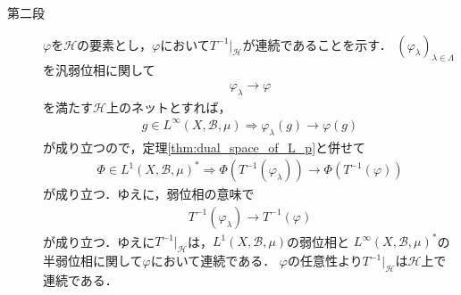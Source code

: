 \begin{description}
		\item[第二段] $\varphi$を$\mathscr{H}$の要素とし，$\varphi$において$T^{-1}|_{\mathscr{H}}$が連続であることを示す．
			$(\varphi_\lambda)_{\lambda \in \Lambda}$を汎弱位相に関して
			\begin{align}
				\varphi_\lambda \longrightarrow \varphi
			\end{align}
			を満たす$\mathscr{H}$上のネットとすれば，
			\begin{align}
				g \in L^\infty(X,\mathcal{B},\mu) \Longrightarrow \varphi_\lambda(g) \longrightarrow \varphi(g)
			\end{align}
			が成り立つので，定理\ref{thm:dual_space_of_L_p}と併せて
			\begin{align}
				\Phi \in L^1(X,\mathcal{B},\mu)^* \Longrightarrow 
				\Phi\left( T^{-1}(\varphi_\lambda) \right) \longrightarrow \Phi\left( T^{-1}(\varphi) \right)
			\end{align}
			が成り立つ．ゆえに，弱位相の意味で
			\begin{align}
				T^{-1}(\varphi_\lambda) \longrightarrow T^{-1}(\varphi)
			\end{align}
			が成り立つ．ゆえに$T^{-1}|_{\mathscr{H}}$は，$L^1(X,\mathcal{B},\mu)$の弱位相と
			$L^\infty(X,\mathcal{B},\mu)^*$の半弱位相に関して$\varphi$において連続である．
			$\varphi$の任意性より$T^{-1}|_{\mathscr{H}}$は$\mathscr{H}$上で連続である．
			\QED
	\end{description}